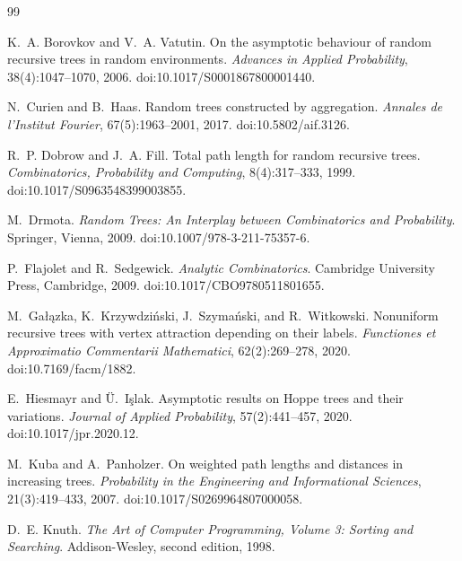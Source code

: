 \documentclass[11pt,a4paper]{article}
\newcommand{\1}{\mathbf{1}}
\begin{document}
\begin{thebibliography}{99}

K.~A. Borovkov and V.~A. Vatutin.
\newblock On the asymptotic behaviour of random recursive trees in random
environments.
\newblock \emph{Advances in Applied Probability}, 38(4):1047--1070, 2006.
\newblock doi:10.1017/S0001867800001440.

N.~Curien and B.~Haas.
\newblock Random trees constructed by aggregation.
\newblock \emph{Annales de l'Institut Fourier}, 67(5):1963--2001, 2017.
\newblock doi:10.5802/aif.3126.

R.~P. Dobrow and J.~A. Fill.
\newblock Total path length for random recursive trees.
\newblock \emph{Combinatorics, Probability and Computing}, 8(4):317--333,
1999.
\newblock doi:10.1017/S0963548399003855.

M.~Drmota.
\newblock \emph{Random Trees: An Interplay between Combinatorics and
Probability}.
\newblock Springer, Vienna, 2009.
\newblock doi:10.1007/978-3-211-75357-6.

P.~Flajolet and R.~Sedgewick.
\newblock \emph{Analytic Combinatorics}.
\newblock Cambridge University Press, Cambridge, 2009.
\newblock doi:10.1017/CBO9780511801655.

M.~Ga\l{}\k{a}zka, K.~Krzywdzi\'nski, J.~Szyma\'nski, and R.~Witkowski.
\newblock Nonuniform recursive trees with vertex attraction depending on their labels.
\newblock \emph{Functiones et Approximatio Commentarii Mathematici},
62(2):269--278, 2020.
\newblock doi:10.7169/facm/1882.

E.~Hiesmayr and {\"U}.~I\c{s}lak.
\newblock Asymptotic results on Hoppe trees and their variations.
\newblock \emph{Journal of Applied Probability}, 57(2):441--457, 2020.
\newblock doi:10.1017/jpr.2020.12.

M.~Kuba and A.~Panholzer.
\newblock On weighted path lengths and distances in increasing trees.
\newblock \emph{Probability in the Engineering and Informational Sciences},
21(3):419--433, 2007.
\newblock doi:10.1017/S0269964807000058.

D.~E. Knuth.
\newblock \emph{The Art of Computer Programming, Volume 3: Sorting and
Searching}.
\newblock Addison-Wesley, second edition, 1998.


\end{thebibliography}
\end{document}
